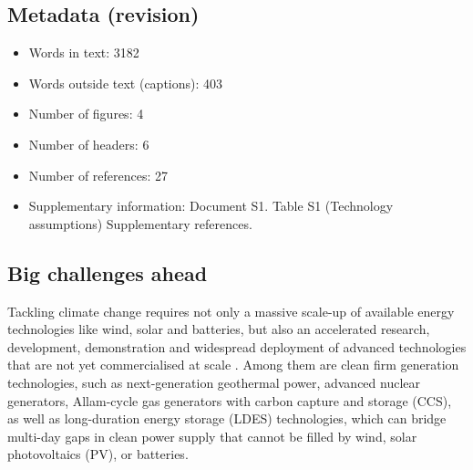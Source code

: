 \documentclass[pdflatex,sn-basic, Numbered]{sn-jnl}
\theoremstyle{thmstyleone}%
\theoremstyle{thmstyletwo}%
\theoremstyle{thmstylethree}%
\begin{document}
\subsection*{Metadata (revision)}
\begin{itemize}
    \item Words in text: 3182
    \item Words outside text (captions): 403
    \item Number of figures: 4
    \item Number of headers: 6
    \item Number of references: 27
    \item Supplementary information: Document S1. Table S1 (Technology assumptions) Supplementary references.
\end{itemize}




\maketitle

\subsection*{Big challenges ahead}\label{sec1}

Tackling climate change requires not only a massive scale-up of available energy technologies like wind, solar and batteries, but also an accelerated research, development, demonstration and widespread deployment of advanced technologies that are not yet commercialised at scale \cite{sepulvedaRoleFirmLowCarbon2018, brownUltralongdurationEnergyStorage2023}.
Among them are clean firm generation technologies, such as next-generation geothermal power, advanced nuclear generators, Allam-cycle gas generators with carbon capture and storage (CCS), as well as long-duration energy storage (LDES) technologies, which can bridge multi-day gaps in clean power supply that cannot be filled by wind, solar photovoltaics (PV), or batteries.
\end{document}
